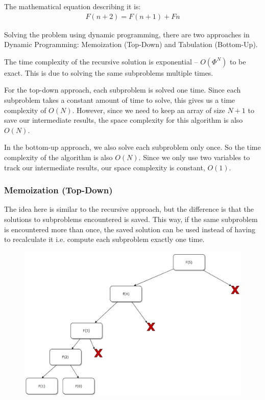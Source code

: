 \documentclass[10pt,a4paper]{article}
\begin{document}
The mathematical equation describing it is:
\begin{align*}
    F(n + 2) = F(n + 1) + Fn
\end{align*}

Solving the problem using dynamic programming, there are two approaches in Dynamic Programming:
Memoization (Top-Down) and Tabulation (Bottom-Up).

The time complexity of the recursive solution is exponential – $O(\Phi^N)$ to be exact. This is due to
solving the same subproblems multiple times.

For the top-down approach, each subproblem is solved one time. Since each subproblem takes a
constant amount of time to solve, this gives us a time complexity of $O(N)$. However, since we need
to keep an array of size $N + 1$ to save our intermediate results, the space complexity for this
algorithm is also $O(N)$.

In the bottom-up approach, we also solve each subproblem only once. So the time complexity of the algorithm is also $O(N)$. Since we only use two variables to track our intermediate results, our space complexity is constant, $O(1)$.

\subsubsection{Memoization (Top-Down)}

The idea here is similar to the recursive approach, but the diﬀerence is that the solutions to
subproblems encountered is saved. This way, if the same subproblem is encountered more than once,
the saved solution can be used instead of having to recalculate it i.e. compute each subproblem
exactly one time.
\begin{figure} [h!]
    \centering
    \includegraphics[scale=0.3]{Fibo.JPG}
\end{figure}
\end{document}
